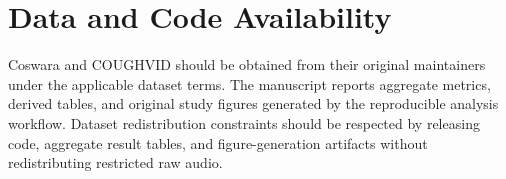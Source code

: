 \documentclass[preprint,12pt]{elsarticle}
\begin{document}
\section*{Data and Code Availability}

Coswara and COUGHVID should be obtained from their original maintainers under the applicable dataset terms. The manuscript reports aggregate metrics, derived tables, and original study figures generated by the reproducible analysis workflow. Dataset redistribution constraints should be respected by releasing code, aggregate result tables, and figure-generation artifacts without redistributing restricted raw audio.



\end{document}
